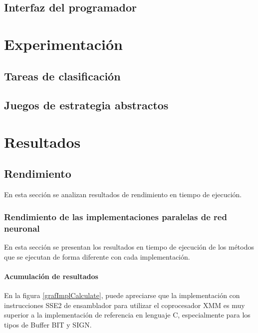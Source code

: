 \documentclass[11pt]{article}
\begin{document}
\begin{titlepage}
  \label{disenoGene}
\subsection{Interfaz del programador}
\label{sec-4-3}

  \label{disenoInterfProgr}
\newpage
\section{Experimentaci\'on}
\label{sec-5}

  \label{experimentacion}
\subsection{Tareas de clasificaci\'on}
\label{sec-5-1}

  \label{}
\subsection{Juegos de estrategia abstractos}
\label{sec-5-2}

  \label{}
\newpage
\section{Resultados}
\label{sec-6}

  \label{resultados}
\subsection{Rendimiento}
\label{sec-6-1}

  \label{rendimiento}

En esta sección se analizan resultados de rendimiento en tiempo de ejecución.
\subsubsection{Rendimiento de las implementaciones paralelas de red neuronal}
\label{sec-6-1-1}

  \label{rendImpl}

En esta sección se presentan los resultados en tiempo de ejecución de los métodos que se ejecutan de forma diferente con cada implementación.
\paragraph{Acumulación de resultados}
\label{sec-6-1-1-1}


En la figura \ref{grafImplCalculate}, puede apreciarse que la implementación con instrucciones SSE2 de ensamblador para utilizar el coprocesador XMM es muy superior a la implementación de referencia en lenguaje C, especialmente para los tipos de Buffer BIT y SIGN.


\end{titlepage}
\end{document}
